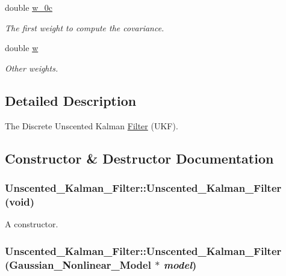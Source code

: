 \begin{CompactItemize}
double \hyperlink{class_unscented___kalman___filter_d04e96c03af71db29723963be6999be6}{w\_\-0c}
\begin{CompactList}\small\item\em The first weight to compute the covariance. \item\end{CompactList}\item 
double \hyperlink{class_unscented___kalman___filter_1869e471af5a12af031e9ff436756b95}{w}
\begin{CompactList}\small\item\em Other weights. \item\end{CompactList}\end{CompactItemize}


\subsection{Detailed Description}
The Discrete Unscented Kalman \hyperlink{class_filter}{Filter} (UKF). 



\subsection{Constructor \& Destructor Documentation}
\hypertarget{class_unscented___kalman___filter_9604c9cbd68ec0ba603964f2677c7e2e}{
\subsubsection[{Unscented\_\-Kalman\_\-Filter}]{\setlength{\rightskip}{0pt plus 5cm}Unscented\_\-Kalman\_\-Filter::Unscented\_\-Kalman\_\-Filter (void)}}
\label{class_unscented___kalman___filter_9604c9cbd68ec0ba603964f2677c7e2e}


A constructor. 

\hypertarget{class_unscented___kalman___filter_b1095ded70883e7a2389fd925fe1e378}{
\subsubsection[{Unscented\_\-Kalman\_\-Filter}]{\setlength{\rightskip}{0pt plus 5cm}Unscented\_\-Kalman\_\-Filter::Unscented\_\-Kalman\_\-Filter ({\bf Gaussian\_\-Nonlinear\_\-Model} $\ast$ {\em model})}}
\label{class_unscented___kalman___filter_b1095ded70883e7a2389fd925fe1e378}


